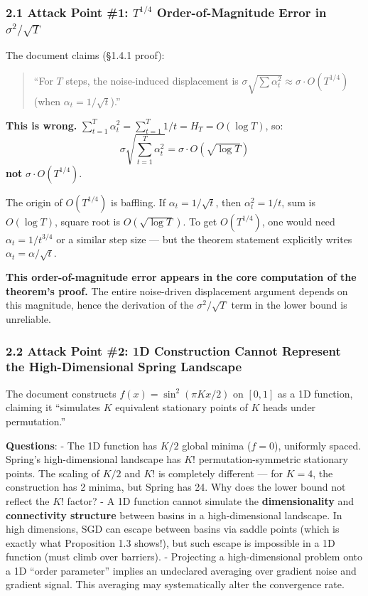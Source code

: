 \documentclass[
  12pt,
]{article}
\begin{document}
\subsubsection{2.1 Attack Point \#1: $T^{1/4}$ Order-of-Magnitude Error in $\sigma^2/\sqrt{T}$}\label{attack-1-magnitude-error}

The document claims (\S1.4.1 proof):
\begin{quote}
``For $T$ steps, the noise-induced displacement is $\sigma \sqrt{\sum \alpha_t^2} \approx \sigma \cdot O(T^{1/4})$ (when $\alpha_t = 1/\sqrt{t}$).''
\end{quote}

\textbf{This is wrong.} $\sum_{t=1}^T \alpha_t^2 = \sum_{t=1}^T 1/t = H_T = O(\log T)$, so:
\[\sigma \sqrt{\sum_{t=1}^T \alpha_t^2} = \sigma \cdot O(\sqrt{\log T})\]
\textbf{not} $\sigma \cdot O(T^{1/4})$.

The origin of $O(T^{1/4})$ is baffling. If $\alpha_t = 1/\sqrt{t}$, then $\alpha_t^2 = 1/t$, sum is $O(\log T)$, square root is $O(\sqrt{\log T})$. To get $O(T^{1/4})$, one would need $\alpha_t = 1/t^{3/4}$ or a similar step size --- but the theorem statement explicitly writes $\alpha_t = \alpha/\sqrt{t}$.

\textbf{This order-of-magnitude error appears in the core computation of the theorem's proof.} The entire noise-driven displacement argument depends on this magnitude, hence the derivation of the $\sigma^2/\sqrt{T}$ term in the lower bound is unreliable.

\subsubsection{2.2 Attack Point \#2: 1D Construction Cannot Represent the High-Dimensional Spring Landscape}\label{attack-2-1d-construction}

The document constructs $f(x) = \sin^2(\pi K x / 2)$ on $[0,1]$ as a 1D function, claiming it ``simulates $K$ equivalent stationary points of $K$ heads under permutation.''

\textbf{Questions}:
- The 1D function has $K/2$ global minima ($f=0$), uniformly spaced. Spring's high-dimensional landscape has $K!$ permutation-symmetric stationary points. The scaling of $K/2$ and $K!$ is completely different --- for $K=4$, the construction has 2 minima, but Spring has 24. Why does the lower bound not reflect the $K!$ factor?
- A 1D function cannot simulate the \textbf{dimensionality} and \textbf{connectivity structure} between basins in a high-dimensional landscape. In high dimensions, SGD can escape between basins via saddle points (which is exactly what Proposition 1.3 shows!), but such escape is impossible in a 1D function (must climb over barriers).
- Projecting a high-dimensional problem onto a 1D ``order parameter'' implies an undeclared averaging over gradient noise and gradient signal. This averaging may systematically alter the convergence rate.
\end{document}
